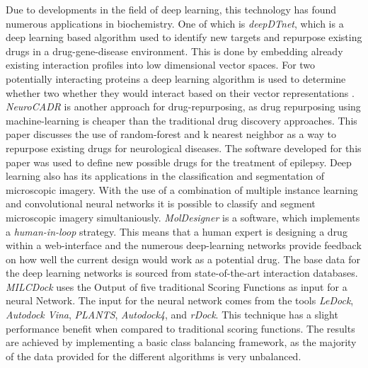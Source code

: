 Due to developments in the field of deep learning, this technology has found numerous applications in biochemistry\cite{Chen2018}.
One of which is \textit{deepDTnet}, which is a deep learning based algorithm used to identify new targets and repurpose existing drugs in a drug-gene-disease environment.
This is done by embedding already existing interaction profiles into low dimensional vector spaces.
For two potentially interacting proteins a deep learning algorithm is used to determine whether two whether they would interact based on their vector representations \cite{Zeng}.
\textit{NeuroCADR} is another approach for drug-repurposing, as drug repurposing using machine-learning is cheaper than the traditional drug discovery approaches.
This paper discusses the use of random-forest and k nearest neighbor as a way to repurpose existing drugs for neurological diseases.
The software developed for this paper was used to define new possible drugs for the treatment of epilepsy.\cite[]{Mamidala2023}
Deep learning also has its applications in the classification and segmentation of microscopic imagery.
With the use of a combination of multiple instance learning and convolutional neural networks it is possible to classify and segment 
microscopic imagery simultaniously\cite{Kraus2016}.
\textit{MolDesigner} is a software, which implements a \textit{human-in-loop} strategy. This means that a human expert is designing a drug within a web-interface and the 
numerous deep-learning networks provide feedback on how well the current design would work as a potential drug.
The base data for the deep learning networks is sourced from state-of-the-art interaction databases\cite[]{Huang2020}.
\textit{MILCDock} uses the Output of five traditional Scoring Functions as input for a neural Network. 
The input for the neural network comes from the tools \textit{LeDock}, \textit{Autodock Vina}, \textit{PLANTS},  \textit{Autodock4}, and \textit{rDock}. 
This technique has a slight performance benefit when compared to traditional scoring functions.
The results are achieved by implementing a basic class balancing framework, as the majority of the data provided for the different algorithms is
very unbalanced\cite[]{Morris2022}.
\newpage